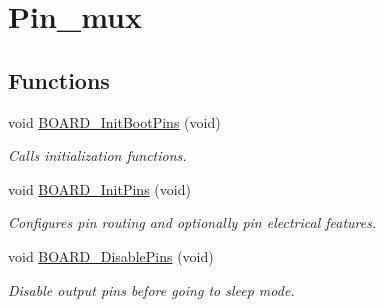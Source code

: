 \hypertarget{group__pin__mux}{}\section{Pin\+\_\+mux}
\label{group__pin__mux}
\subsection*{Functions}
\begin{DoxyCompactItemize}
\item 
void \mbox{\hyperlink{group__pin__mux_ga8652eb15efb9dfe7368dd7f292dab554}{B\+O\+A\+R\+D\+\_\+\+Init\+Boot\+Pins}} (void)
\begin{DoxyCompactList}\small\item\em Calls initialization functions. \end{DoxyCompactList}\item 
void \mbox{\hyperlink{group__pin__mux_ga2c9fe54b6b84723fbaa590a6f4576966}{B\+O\+A\+R\+D\+\_\+\+Init\+Pins}} (void)
\begin{DoxyCompactList}\small\item\em Configures pin routing and optionally pin electrical features. \end{DoxyCompactList}\item 
void \mbox{\hyperlink{group__pin__mux_ga18145d0a226cc9ba105372695e8ade79}{B\+O\+A\+R\+D\+\_\+\+Disable\+Pins}} (void)
\begin{DoxyCompactList}\small\item\em Disable output pins before going to sleep mode. \end{DoxyCompactList}\end{DoxyCompactItemize}
